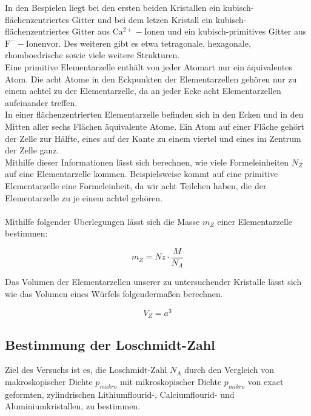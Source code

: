 \documentclass[12pt,a4paper,titlepage,headinclude,bibtotoc]{scrartcl}
\begin{document}
\vspace{10cm}
In den Bespielen liegt bei den ersten beiden Kristallen ein kubisch-flächenzentriertes Gitter und bei dem letzen Kristall ein kubisch-flächenzentriertes Gitter aus $\mathrm {Ca^{2+}-Ionen}$ und ein kubisch-primitives Gitter aus $ \mathrm {F^{-}-Ionen vor}$. Des weiteren gibt es etwa tetragonale, hexagonale, rhomboedrische sowie viele weitere Strukturen.\\ Eine primitive Elementarzelle enthält von jeder Atomart nur ein äquivalentes Atom. Die acht Atome in den Eckpunkten der Elementarzellen gehören nur zu einem achtel zu der Elementarzelle, da an jeder Ecke acht Elementarzellen aufeinander treffen.\\
In einer flächenzentrierten Elementarzelle befinden sich in den Ecken und in den Mitten aller sechs Flächen äquivalente Atome. Ein Atom auf einer Fläche gehört der Zelle zur Hälfte, eines auf der Kante zu einem viertel und eines im Zentrum der Zelle ganz.\\
Mithilfe dieser Informationen lässt sich berechnen, wie viele Formeleinheiten $N_{Z}$ auf eine Elementarzelle kommen. Beispielsweise kommt auf eine primitive Elementarzelle eine Formeleinheit, da wir acht Teilchen haben, die der Elementarzelle zu je einem achtel gehören.\\\\ Mithilfe folgender Überlegungen lässt sich die Masse $m_{Z}$ einer Elementarzelle bestimmen:

\begin{equation}
m_{Z}=Nz \cdot \dfrac{M}{N_{A}}
\end{equation} 

Das Volumen der Elementarzellen unserer zu untersuchender Kristalle lässt sich wie das Volumen eines Würfels folgendermaßen berechnen.

\begin{equation}
V_Z = a^3
\end{equation}


\subsection{Bestimmung der Loschmidt-Zahl}
 
Ziel des Versuchs ist es, die Loschmidt-Zahl $N_{A}$ durch den Vergleich von makroskopischer Dichte $p_{makro}$ mit mikroskopischer Dichte $p_{mikro}$ von exact geformten, zylindrischen Lithiumflourid-, Calciumflourid- und Aluminiumkristallen, zu bestimmen.\\\\
\end{document}
